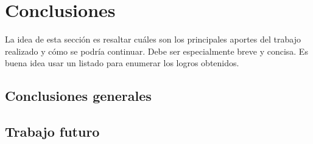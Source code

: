 
\chapter{Conclusiones} %

\label{Chapter5} %



La idea de esta sección es resaltar cuáles son los principales aportes del trabajo realizado y cómo se podría continuar. Debe ser especialmente breve y concisa. Es buena idea usar un listado para enumerar los logros obtenidos.

\section{Conclusiones generales}



\section{Trabajo futuro}

